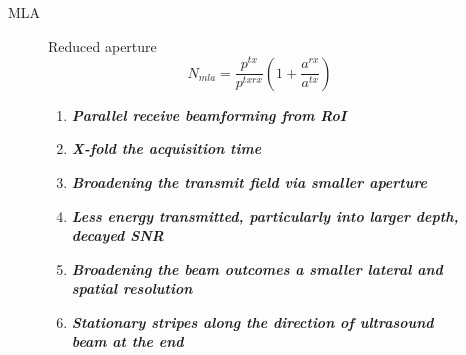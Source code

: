\documentclass[t,12pt,english
\ifx\beamermode\undefined\else,\beamermode\fi
]{beamer}
\begin{document}
\begin{frame}{MLA }


\begin{figure}[!htb]


\begin{block}{\footnotesize{\tiny Reduced aperture\cite{4}}}\tiny{}
\begin{equation}
N_{mla}=\frac{p^{tx}}{p^{txrx}}(1+\frac{a^{rx}}{a^{tx}})
\end{equation}
\begin{enumerate} 
\vspace{0.05cm}

     \item \tiny{\textbf{\textit{Parallel receive beamforming from RoI}}}
     \item \tiny{\textbf{\textit{X-fold the acquisition time}}}
     \item \tiny{\textbf{\textit{Broadening the transmit field via smaller aperture}}}
     \color{red}
     \item \tiny{\textbf{\textit{Less energy transmitted, particularly into larger depth, decayed SNR}}}
     \item \tiny{\textbf{\textit{Broadening the beam outcomes a smaller lateral and spatial resolution}}}
     \item \tiny{\textbf{\textit{Stationary stripes along the direction of ultrasound beam at the end}}}
     

\end{enumerate}
\end{block}
\end{figure}
\end{frame}
\end{document}
